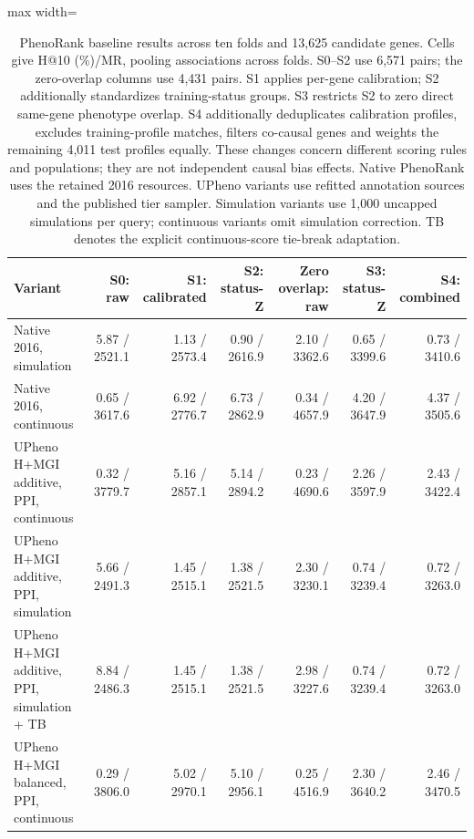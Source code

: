 \begin{landscape}
\begin{table}[p]
\centering\footnotesize
\setlength{\tabcolsep}{3pt}
\caption{PhenoRank baseline results across ten folds and 13,625 candidate genes. Cells give H@10 (\%)/MR, pooling associations across folds. S0--S2 use 6,571 pairs; the zero-overlap columns use 4,431 pairs. S1 applies per-gene calibration; S2 additionally standardizes training-status groups. S3 restricts S2 to zero direct same-gene phenotype overlap. S4 additionally deduplicates calibration profiles, excludes training-profile matches, filters co-causal genes and weights the remaining 4,011 test profiles equally. These changes concern different scoring rules and populations; they are not independent causal bias effects. Native PhenoRank uses the retained 2016 resources. UPheno variants use refitted annotation sources and the published tier sampler. Simulation variants use 1,000 uncapped simulations per query; continuous variants omit simulation correction. TB denotes the explicit continuous-score tie-break adaptation.}
\label{tab:final_baseline_phenorank}
\begin{adjustbox}{max width=\linewidth}
\begin{tabular}{lrrrrrr}
\toprule
Variant & S0: raw & S1: calibrated & S2: status-Z & Zero overlap: raw & S3: status-Z & S4: combined \\
\midrule
Native 2016, simulation & 5.87 / 2521.1 & 1.13 / 2573.4 & 0.90 / 2616.9 & 2.10 / 3362.6 & 0.65 / 3399.6 & 0.73 / 3410.6 \\
Native 2016, continuous & 0.65 / 3617.6 & 6.92 / 2776.7 & 6.73 / 2862.9 & 0.34 / 4657.9 & 4.20 / 3647.9 & 4.37 / 3505.6 \\
UPheno H+MGI additive, PPI, continuous & 0.32 / 3779.7 & 5.16 / 2857.1 & 5.14 / 2894.2 & 0.23 / 4690.6 & 2.26 / 3597.9 & 2.43 / 3422.4 \\
UPheno H+MGI additive, PPI, simulation & 5.66 / 2491.3 & 1.45 / 2515.1 & 1.38 / 2521.5 & 2.30 / 3230.1 & 0.74 / 3239.4 & 0.72 / 3263.0 \\
UPheno H+MGI additive, PPI, simulation + TB & 8.84 / 2486.3 & 1.45 / 2515.1 & 1.38 / 2521.5 & 2.98 / 3227.6 & 0.74 / 3239.4 & 0.72 / 3263.0 \\
UPheno H+MGI balanced, PPI, continuous & 0.29 / 3806.0 & 5.02 / 2970.1 & 5.10 / 2956.1 & 0.25 / 4516.9 & 2.30 / 3640.2 & 2.46 / 3470.5 \\

\end{tabular}
\end{adjustbox}
\end{table}
\end{landscape}

